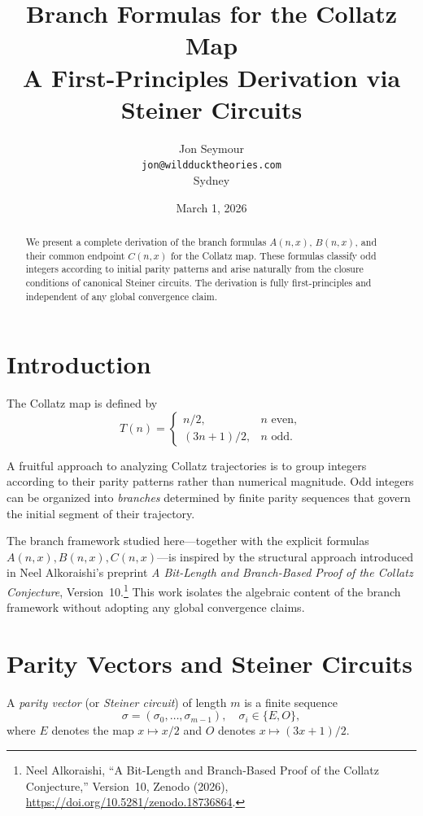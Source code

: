 \documentclass[12pt]{article}
\title{Branch Formulas for the Collatz Map\\
\large A First-Principles Derivation via Steiner Circuits}
\author{Jon Seymour\\ \texttt{jon@wildducktheories.com}\\ Sydney}
\date{March 1, 2026}
\begin{document}
\maketitle

\begin{abstract}
We present a complete derivation of the branch formulas \(A(n,x)\), \(B(n,x)\),
and their common endpoint \(C(n,x)\) for the Collatz map. These formulas classify
odd integers according to initial parity patterns and arise naturally from the
closure conditions of canonical Steiner circuits. The derivation is fully
first-principles and independent of any global convergence claim.
\end{abstract}

\section{Introduction}

The Collatz map is defined by
\[
T(n) =
\begin{cases}
n/2, & n \text{ even},\\[2mm]
(3n+1)/2, & n \text{ odd}.
\end{cases}
\]

A fruitful approach to analyzing Collatz trajectories is to group integers
according to their parity patterns rather than numerical magnitude. Odd integers
can be organized into \emph{branches} determined by finite parity sequences that
govern the initial segment of their trajectory.

The branch framework studied here—together with the explicit formulas
\(A(n,x), B(n,x), C(n,x)\)—is inspired by the structural approach introduced
in Neel Alkoraishi’s preprint
\emph{A Bit-Length and Branch-Based Proof of the Collatz Conjecture}, Version~10.\footnote{
Neel Alkoraishi, ``A Bit-Length and Branch-Based Proof of the Collatz Conjecture,''
Version~10, Zenodo (2026),
\url{https://doi.org/10.5281/zenodo.18736864}.}
This work isolates the algebraic content of the branch framework without
adopting any global convergence claims.

\section{Parity Vectors and Steiner Circuits}

A \emph{parity vector} (or \emph{Steiner circuit})\cite{Steiner1977} of length \(m\) is a finite
sequence
\[
\sigma = (\sigma_0, \dots, \sigma_{m-1}), \quad \sigma_i \in \{E,O\},
\]
where \(E\) denotes the map \(x \mapsto x/2\) and \(O\) denotes \(x \mapsto (3x+1)/2\).
\end{document}
